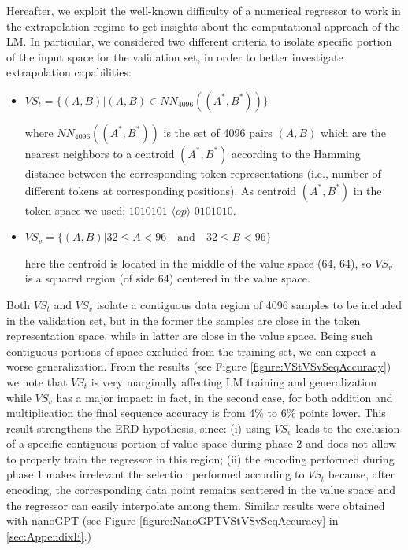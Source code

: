 \documentclass[final,1p,times,authoryear]{elsarticle}
\begin{document}
Hereafter, we exploit the well-known difficulty of a numerical regressor to work in the extrapolation regime to get insights about the computational approach of the LM. In particular, we considered two different criteria to isolate specific portion of the input space for the validation set, in order to better investigate extrapolation capabilities: 

\begin{itemize}
\item $VS_t=\{(A,B)|(A,B)\in NN_{4096}((A^*,B^*))\}$
                
        where $NN_{4096}((A^*,B^*))$ is the set of 4096 pairs $(A,B)$ which are the nearest neighbors to a centroid $(A^*,B^*)$ according to the Hamming distance between the corresponding token representations (i.e., number of different tokens at corresponding positions). As centroid $(A^*,B^*)$ in the token space we used: $1010101$ $\langle op \rangle$ $0101010$.
\item $VS_v=\{(A,B)|32 \leq A<96 \quad \textrm{and} \quad 32 \leq B<96\}$

        here the centroid is located in the middle of the value space (64, 64), so $VS_v$ is a squared region (of side 64) centered in the value space.
\end{itemize}

Both $VS_t$ and $VS_v$ isolate a contiguous data region of 4096 samples to be included in the validation set, but in the former the samples are close in the token representation space, while in latter are close in the value space. Being such contiguous portions of space excluded from the training set, we can expect a worse generalization. From the results (see Figure \ref{figure:VStVSvSeqAccuracy}) we note that $VS_t$ is very marginally affecting LM training and generalization while $VS_v$ has a major impact: in fact, in the second case, for both addition and multiplication the final sequence accuracy is from 4\% to 6\% points lower. This result strengthens the ERD hypothesis, since: (i) using $VS_v$ leads to the exclusion of a specific contiguous portion of value space during phase 2 and does not allow to properly train the regressor in this region; (ii) the encoding performed during phase 1 makes irrelevant the selection performed according to $VS_t$ because, after encoding, the corresponding data point remains scattered in the value space and the regressor can easily interpolate among them. Similar results were obtained with nanoGPT (see Figure \ref{figure:NanoGPTVStVSvSeqAccuracy} in \ref{sec:AppendixE}.)
\end{document}
